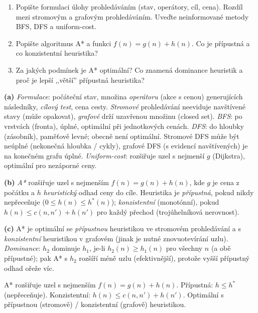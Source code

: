 \begin{zadani}
\begin{enumerate}[label=(\alph*)]
  \item {} Popište formulaci úlohy prohledáváním (stav, operátory, cíl, cena). Rozdíl mezi stromovým a grafovým prohledáváním. Uveďte neinformované metody BFS, DFS a uniform-cost.
  \item {} Popište algoritmus A* a funkci $f(n)=g(n)+h(n)$. Co je přípustná a co konzistentní heuristika?
  \item {} Za jakých podmínek je A* optimální? Co znamená dominance heuristik a proč je lepší ,,větší'' přípustná heuristika?
\end{enumerate}
\end{zadani}

\begin{reseni}
\textbf{(a)} \emph{Formulace}: počáteční stav, množina \emph{operátoru} (akce s cenou) generujících následníky, \emph{cílový test}, cena cesty. \emph{Stromové} prohledávání neeviduje navštívené stavy (může opakovat), \emph{grafové} drží uzavřenou množinu (closed set). \emph{BFS}: po vrstvách (fronta), úplné, optimální při jednotkových cenách. \emph{DFS}: do hloubky (zásobník), paměťově levné; obecně není optimální. Stromové DFS může být neúplné (nekonečná hloubka / cykly), grafové DFS (s evidencí navštívených) je na konečném grafu úplné. \emph{Uniform-cost}: rozšiřuje uzel s nejmenší $g$ (Dijkstra), optimální pro nezáporné ceny.

\textbf{(b)} \emph{A*} rozšiřuje uzel s nejmenším $f(n)=g(n)+h(n)$, kde $g$ je cena z počátku a $h$ \emph{heuristický} odhad ceny do cíle. Heuristika je \emph{přípustná}, pokud nikdy nepřeceňuje ($0\le h(n)\le h^*(n)$); \emph{konzistentní} (monotónní), pokud $h(n)\le c(n,n')+h(n')$ pro každý přechod (trojúhelníková nerovnost).

\textbf{(c)} A* je optimální se \emph{přípustnou} heuristikou ve stromovém prohledávání a s \emph{konzistentní} heuristikou v grafovém (jinak je nutné znovuotevírání uzlu). \emph{Dominance}: $h_2$ dominuje $h_1$, je-li $h_2(n)\ge h_1(n)$ pro všechny $n$ (a obě přípustné); pak A* s $h_2$ rozšíří méně uzlu (efektivnější), protože vyšší přípustný odhad ořeže víc.
\end{reseni}

\begin{jadro}
A* rozšiřuje uzel s nejmenším $f(n)=g(n)+h(n)$. Přípustná: $h\le h^*$ (nepřeceňuje). Konzistentní: $h(n)\le c(n,n')+h(n')$. Optimální s přípustnou (stromově) / konzistentní (grafově) heuristikou.
\end{jadro}

